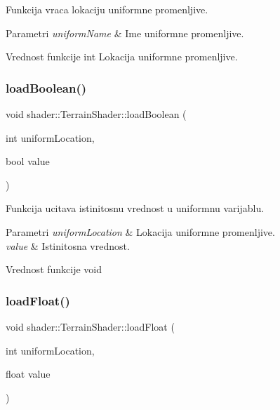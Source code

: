 Funkcija vraca lokaciju uniformne promenljive. 


\begin{DoxyParams}{Parametri}
{\em uniform\+Name} & Ime uniformne promenljive. \\
\hline
\end{DoxyParams}
\begin{DoxyReturn}{Vrednost funkcije}
int Lokacija uniformne promenljive. 
\end{DoxyReturn}
\mbox{\label{classshader_1_1TerrainShader_adba13f15120aff8a5015955afed332b2}} 
\subsubsection{\texorpdfstring{load\+Boolean()}{loadBoolean()}}
{\footnotesize\ttfamily void shader\+::\+Terrain\+Shader\+::load\+Boolean (\begin{DoxyParamCaption}\item[{int}]{uniform\+Location,  }\item[{bool}]{value }\end{DoxyParamCaption})}



Funkcija ucitava istinitosnu vrednost u uniformnu varijablu. 


\begin{DoxyParams}{Parametri}
{\em uniform\+Location} & Lokacija uniformne promenljive. \\
\hline
{\em value} & Istinitosna vrednost. \\
\hline
\end{DoxyParams}
\begin{DoxyReturn}{Vrednost funkcije}
void 
\end{DoxyReturn}
\mbox{\label{classshader_1_1TerrainShader_a9d4a75f7aa0ab0834dbef2d147919c47}} 
\subsubsection{\texorpdfstring{load\+Float()}{loadFloat()}}
{\footnotesize\ttfamily void shader\+::\+Terrain\+Shader\+::load\+Float (\begin{DoxyParamCaption}\item[{int}]{uniform\+Location,  }\item[{float}]{value }\end{DoxyParamCaption})}



